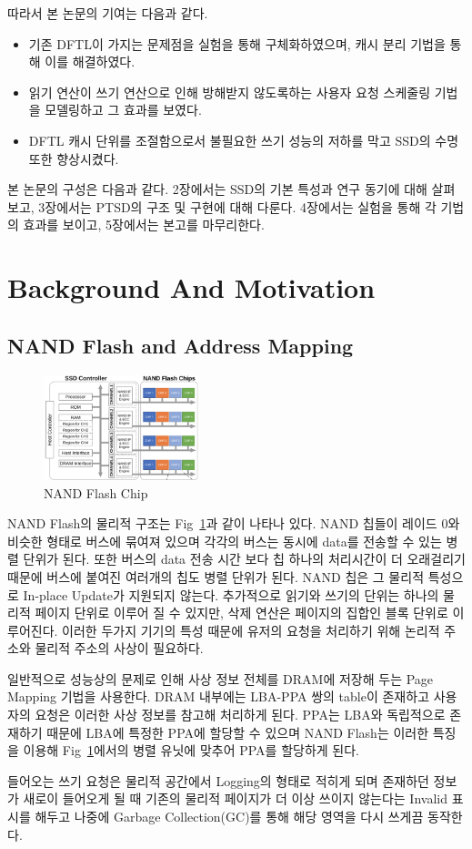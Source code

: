 \documentclass[conference]{IEEEtran}
\begin{document}
따라서 본 논문의 기여는 다음과 같다.
\begin{itemize}
	\item{기존 DFTL이 가지는 문제점을 실험을 통해 구체화하였으며, 캐시 분리 기법을 통해 이를 해결하였다.}
	\item{읽기 연산이 쓰기 연산으로 인해 방해받지 않도록하는 사용자 요청 스케줄링 기법을 모델링하고 그 효과를 보였다.}
	\item{DFTL 캐시 단위를 조절함으로서 불필요한 쓰기 성능의 저하를 막고 SSD의 수명 또한 향상시켰다.}
\end{itemize}
\par

본 논문의 구성은 다음과 같다. 2장에서는 SSD의 기본 특성과 연구 동기에 대해 살펴보고, 3장에서는 PTSD의 구조 및
구현에 대해 다룬다. 4장에서는 실험을 통해 각 기법의 효과를 보이고, 5장에서는 본고를 마무리한다.


\section{Background And Motivation}
\subsection{NAND Flash and Address Mapping}
\begin{figure}[h]
	\centering
	\includegraphics[width=0.4\textwidth]{image/bg/chips.png}
	\caption{NAND Flash Chip \cite{b1}}
	\label{fig:chips}
\end{figure}
NAND Flash의 물리적 구조는 Fig~\ref{fig:chips}과 같이 나타나 있다. NAND 칩들이 레이드 0와 비슷한 형태로 버스에 묶여져 있으며 각각의 버스는 동시에 data를 전송할 수 있는 병렬 단위가 된다. 또한 버스의 data 전송 시간 보다 칩 하나의 처리시간이 더 오래걸리기 때문에 버스에 붙여진 여러개의 칩도 병렬 단위가 된다. NAND 칩은 그 물리적 특성으로 In-place Update가 지원되지 않는다. 추가적으로 읽기와 쓰기의 단위는 하나의 물리적 페이지 단위로 이루어 질 수 있지만, 삭제 연산은 페이지의 집합인 블록 단위로 이루어진다. 이러한 두가지 기기의 특성 때문에 유저의 요청을 처리하기 위해 논리적 주소와 물리적 주소의 사상이 필요하다. \par
일반적으로 성능상의 문제로 인해 사상 정보 전체를 DRAM에 저장해 두는 Page Mapping 기법을 사용한다.
DRAM 내부에는 LBA-PPA 쌍의 table이 존재하고 사용자의 요청은 이러한 사상 정보를 참고해 처리하게 된다.
PPA는 LBA와 독립적으로 존재하기 때문에 LBA에 특정한 PPA에 할당할 수 있으며 NAND Flash는 이러한 특징을 이용해 Fig~\ref{fig:chips}에서의 병렬 유닛에 맞추어 PPA를 할당하게 된다.\par
들어오는 쓰기 요청은 물리적 공간에서 Logging의 형태로 적히게 되며 존재하던 정보가 새로이 들어오게 될 때 기존의 물리적 페이지가 더 이상 쓰이지 않는다는 Invalid 표시를 해두고 나중에 Garbage Collection(GC)를 통해 해당 영역을 다시 쓰게끔 동작한다.
\end{document}
